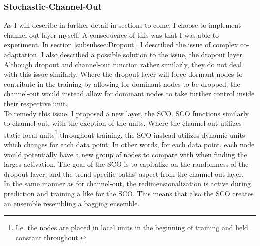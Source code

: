 \subsubsection*{Stochastic-Channel-Out}\label{subsubsec:stochchannelout}
As I will describe in further detail in sections to come, I choose to implement channel-out layer myself. A consequence of this 
was that I was able to experiment. In section \ref{subsubsec:Dropout}, I described the issue of complex co-adaptation. I also described 
a possible solution to the issue, the dropout layer. Although dropout and channel-out function rather similarly, they do not deal 
with this issue similarly. Where the dropout layer will force dormant nodes to contribute in the training by allowing for dominant
nodes to be dropped, the channel-out would instead allow for dominant nodes to take further control inside their respective unit.
\\
To remedy this issue, I proposed a new layer, the \ac{SCO}. \ac{SCO} functions similarly to channel-out, with the exeption of 
the units. Where the channel-out utilizes static local units\footnote{I.e. the nodes are placed in local units in the beginning of training 
and held constant throughout.} throughout training, the \ac{SCO} instead utilizes dynamic units which changes for each data point. In other words, 
for each data point, each node would potentially have a new group of nodes to compare with when finding the larges activation.
The goal of the \ac{SCO} is to capitalize on the randomness of the dropout layer, and the trend specific paths' aspect from the 
channel-out layer.
\\
In the same manner as for channel-out, the redimensionalization is active during prediction and training a like for the \ac{SCO}. This 
means that also the \ac{SCO} creates an ensemble resembling a bagging ensemble.
